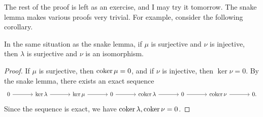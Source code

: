The rest of the proof is left as an exercise, and I may try it tomorrow. The snake lemma makes various proofs very trivial. For example, consider the following corollary.
\begin{corollary}
	In the same situation as the snake lemma, if $\mu $ is surjective and $\nu $ is injective, then $\lambda $ is surjective and $\nu $ is an isomorphism.
\end{corollary}
\begin{proof}
	If $\mu $ is surjective, then $\operatorname{coker} \mu =0$, and if $\nu $ is injective, then $\ker \nu =0$. By the snake lemma, there exists an exact sequence
	\[\begin{tikzcd}[row sep=2.5em, column sep=3.5em]
		0\arrow[r]&\ker \lambda \arrow[r]&\ker \mu \arrow[r]&0\arrow[r]&\coker \lambda \arrow[r]&0\arrow[r]&\coker \nu \arrow[r]&0.
	\end{tikzcd}\]
	Since the sequence is exact, we have $\operatorname{coker} \lambda ,\operatorname{coker} \nu =0$.
\end{proof}
